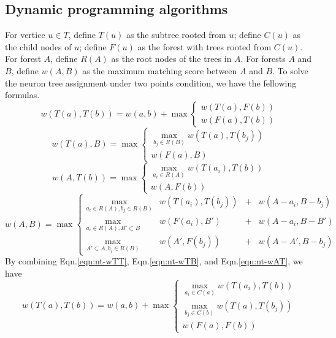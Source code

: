 \subsection{Dynamic programming algorithms}
For vertice $u \in T$, define $T(u)$ as the subtree rooted from $u$; define $C(u)$ as the child nodes of $u$; define $F(u)$ as the forest with trees rooted from $C(u)$. For forest $A$, define $R(A)$ as the root nodes of the trees in $A$. For forests $A$ and $B$, define $w(A,B)$ as the maximum matching score between $A$ and $B$. To solve the neuron tree assignment under two points condition, we have the fellowing formulas.
\begin{equation} \label{eqn:nt-wTT}
w(T(a), T(b)) = w(a,b) + \max\left\{ \begin{array}{l}
                    w(T(a), F(b)) \\
					w(F(a), T(b))
					\end{array} \right.
\end{equation}
\begin{equation}\label{eqn:nt-wTB}
w(T(a), B) = \max\left\{ \begin{array}{l}
                    \max_{b_j \in R(B)}w(T(a), T(b_j)) \\
	                w(F(a), B)
			     \end{array} \right.
\end{equation}
\begin{equation}\label{eqn:nt-wAT}
w(A, T(b)) = \max\left\{ \begin{array}{l}
                  \max_{a_i \in R(A)} w(T(a_i), T(b))\\
				  w(A, F(b))
				  \end{array} \right.
\end{equation}
\begin{equation}
w(A,B) = \max\left\{ \begin{array}{llcl}
			 \max_{a_i \in R(A), b_j \in R(B)} & w(T(a_i), T(b_j)) & + & w(A-a_i, B-b_j) \\
			 \max_{a_i \in R(A), B' \subset B} & w(F(a_i), B') & + & w(A-a_i, B-B') \\
			 \max_{A' \subset A, b_j \in R(B)} & w(A', F(b_j)) & + & w(A-A', B-b_j)
	\end{array} \right.
\end{equation}
By combining Eqn.\ref{eqn:nt-wTT}, Eqn.\ref{eqn:nt-wTB}, and Eqn.\ref{eqn:nt-wAT}, we have
\begin{equation}
w(T(a), T(b)) = w(a,b) + \max\left\{ \begin{array}{l}
                    \max_{a_i \in C(a)} w(T(a_i), T(b)) \\
                    \max_{b_j \in C(b)} w(T(a), T(b_j)) \\
					w(F(a), F(b))
					\end{array} \right.
\end{equation}


